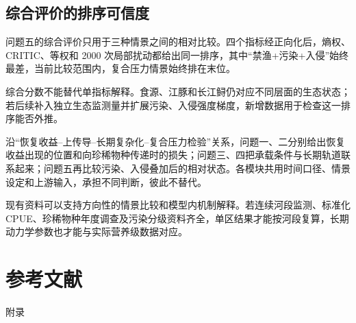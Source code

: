\documentclass{MMCStyle}
\begin{document}
\subsection{综合评价的排序可信度}
问题五的综合评价只用于三种情景之间的相对比较。四个指标经正向化后，熵权、CRITIC、等权和 2000 次局部扰动都给出同一排序，其中“禁渔+污染+入侵”始终最差，当前比较范围内，复合压力情景始终排在末位。

综合分数不能替代单指标解释。食源、江豚和长江鲟仍对应不同层面的生态状态；若后续补入独立生态监测量并扩展污染、入侵强度梯度，新增数据用于检查这一排序能否外推。

\noindent 沿“恢复收益--上传导--长期复杂化--复合压力检验”关系，问题一、二分别给出恢复收益出现的位置和向珍稀物种传递时的损失；问题三、四把承载条件与长期轨道联系起来；问题五再比较污染、入侵叠加后的相对状态。各模块共用时间口径、情景设定和上游输入，承担不同判断，彼此不替代。

\noindent 现有资料可以支持方向性的情景比较和模型内机制解释。若连续河段监测、标准化CPUE、珍稀物种年度调查及污染分级资料齐全，单区结果才能按河段复算，长期动力学参数也才能与实际营养级数据对应。

\section{参考文献}
\printbibliography[heading=none]

\appendix
\begin{center}
\heiti{} 附\hspace{1pc}录
\end{center}
\end{document}

